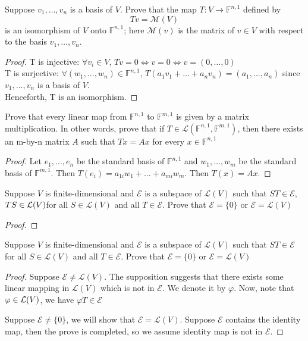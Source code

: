 \begin{exercise}
Suppose $v_1, \ldots ,v_n$ is a basis of $V$. Prove that the map $T: V \to \mathbb{F}^{n,1}$ defined by \[
	Tv = \mathcal{M}(V)\]
is an isomorphism of $V$ onto $\mathbb{F}^{n,1}$; here $\mathcal{M}(v)$ is the matrix of $v \in V$ with respect to the basis $v_1, \ldots, v_n.$
\end{exercise}
\begin{proof}
	T is injective: $\forall v_i \in  V$, $Tv = 0 \iff v = 0 \iff v = (0, \ldots ,0)$ \\
	T is surjective: $\forall (w_1, \ldots ,w_n) \in \mathbb{F}^{n,1}$, $T(a_1v_1 + \ldots + a_nv_n) = (a_1, \ldots ,a_n)$ since $v_1, \ldots ,v_n$ is a basis of $V$. \\
	Henceforth, T is an isomorphism.
\end{proof}

\begin{exercise}
Prove that every linear map from $\mathbb{F}^{n,1}$ to $\mathbb{F}^{m,1}$ is given by a matrix multiplication. In other words, prove that if $T \in \mathcal{L}(\mathbb{F}^{n,1}, \mathbb{F}^{m,1})$, then there exists an m-by-n matrix $A$ such that $Tx = Ax$ for every $x \in \mathbb{F}^{n,1}$
\end{exercise}
\begin{proof}
	Let $e_1, \ldots ,e_n$ be the standard basis of $\mathbb{F}^{n,1}$ and $w_1, \ldots ,w_m$ be the standard basis of $\mathbb{F}^{m,1}$. Then $T(e_i) = a_{1i}w_1 + \ldots + a_{mi}w_m$. Then $T(x) = Ax$.
\end{proof}


\begin{exercise}
Suppose $V$ is finite-dimensional and $\mathcal{E}$ is a subspace of $\mathcal{L}(V)$ such that $ST \in \mathcal{E}$, $TS \in \mathcal{L}(V)$for all $S \in \mathcal{L}(V)$ and all $T \in \mathcal{E}$. Prove that $\mathcal{E} = \{0\}$ or $\mathcal{E} = \mathcal{L}(V)$
\end{exercise}
\begin{proof}
\end{proof}

\begin{exercise}
Suppose $V$ is finite-dimensional and $\mathcal{E}$ is a subspace of $\mathcal{L}(V)$ such that $ST \in \mathcal{E}$ for all $S \in \mathcal{L}(V)$ and all $T \in \mathcal{E}$. Prove that $\mathcal{E} = \{0\}$ or $\mathcal{E} = \mathcal{L}(V)$
\end{exercise}
\begin{proof}
	Suppose $\mathcal{E} \neq \mathcal{L}(V)$. The supposition suggests that there exists some linear mapping in $\mathcal{L}(V)$ which is not in $\mathcal{E}$. We denote it by $\varphi$. Now, note that $\varphi \in \mathcal{L}(V)$, we have $\varphi T \in \mathcal{E}$
	\par
	Suppose $\mathcal{E} \neq \{0\}$, we will show that $\mathcal{E} = \mathcal{L}(V).$ Suppose $\mathcal{E}$ contains the identity map, then the prove is completed, so we assume identity map is not in $\mathcal{E}$.
\end{proof}

